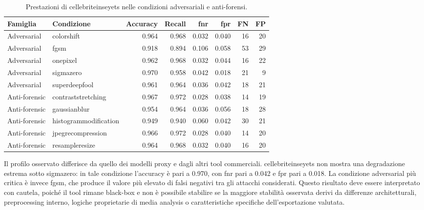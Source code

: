 \begin{table}[H]
\centering
\caption{Prestazioni di \gls{cellebriteinseyets} nelle condizioni adversariali e anti-forensi.}
\label{tab:results-cellebrite-attack-metrics}
\scriptsize
\renewcommand{\arraystretch}{1.12}
\setlength{\tabcolsep}{4pt}
\begin{tabular}{@{}l l r r r r r r@{}}
\toprule
\textbf{Famiglia} &
\textbf{Condizione} &
\textbf{Accuracy} &
\textbf{Recall} &
\textbf{\gls{fnr}} &
\textbf{\gls{fpr}} &
\textbf{FN} &
\textbf{FP} \\
\midrule

Adversarial &
\gls{colorshift} &
0.964 &
0.968 &
0.032 &
0.040 &
16 &
20 \\

Adversarial &
\gls{fgsm} &
0.918 &
0.894 &
0.106 &
0.058 &
53 &
29 \\

Adversarial &
\gls{onepixel} &
0.962 &
0.968 &
0.032 &
0.044 &
16 &
22 \\

Adversarial &
\gls{sigmazero} &
0.970 &
0.958 &
0.042 &
0.018 &
21 &
9 \\

Adversarial &
\gls{superdeepfool} &
0.961 &
0.964 &
0.036 &
0.042 &
18 &
21 \\

\midrule

Anti-forensic &
\gls{contraststretching} &
0.967 &
0.972 &
0.028 &
0.038 &
14 &
19 \\

Anti-forensic &
\gls{gaussianblur} &
0.954 &
0.964 &
0.036 &
0.056 &
18 &
28 \\

Anti-forensic &
\gls{histogrammodification} &
0.949 &
0.940 &
0.060 &
0.042 &
30 &
21 \\

Anti-forensic &
\gls{jpegrecompression} &
0.966 &
0.972 &
0.028 &
0.040 &
14 &
20 \\

Anti-forensic &
\gls{resampleresize} &
0.964 &
0.968 &
0.032 &
0.040 &
16 &
20 \\

\bottomrule
\end{tabular}
\end{table}

Il profilo osservato differisce da quello dei modelli proxy e dagli altri tool
commerciali. \gls{cellebriteinseyets} non mostra una degradazione estrema sotto
\gls{sigmazero}: in tale condizione l'accuracy è pari a 0.970, con \gls{fnr}
pari a 0.042 e \gls{fpr} pari a 0.018. La condizione adversarial più critica è
invece \gls{fgsm}, che produce il valore più elevato di falsi negativi tra gli
attacchi considerati. Questo risultato deve essere interpretato con cautela,
poiché il tool rimane black-box e non è possibile stabilire se la maggiore
stabilità osservata derivi da differenze architetturali, preprocessing interno,
logiche proprietarie di media analysis o caratteristiche specifiche
dell'esportazione valutata.

